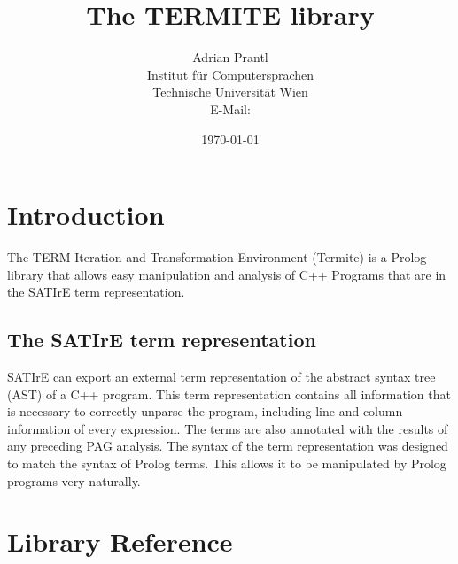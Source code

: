 \documentclass[10pt,twoside]{scrreprt}
\title{The TERMITE library}
\author{Adrian Prantl\\
  Institut f\"{u}r Computersprachen\\
  Technische Universit\"{a}t Wien\\
  E-Mail: \email{adrian@complang.tuwien.ac.at}
}
\date{\today}
\begin{document}
\maketitle

\tableofcontents

\chapter{Introduction}

The TERM Iteration and Transformation Environment (Termite) is a
Prolog library that allows easy manipulation and analysis of C++
Programs that are in the SATIrE term representation.

\section{The SATIrE term representation}

SATIrE can export an external term representation of the abstract
syntax tree (AST) of a C++ program. This term representation contains
all information that is necessary to correctly unparse the program,
including line and column information of every expression. The terms
are also annotated with the results of any preceding PAG analysis. The
syntax of the term representation was designed to match the syntax of
Prolog terms. This allows it to be manipulated by Prolog programs very
naturally.


\chapter{Library Reference}



\end{document}
